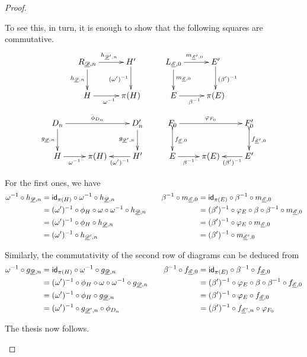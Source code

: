 \begin{proof}
\begin{itemize}
		To see this, in turn, it is enough to show that	the following squares are commutative.
		\[\xymatrix{R_{\der{D}, n} \ar[d]_{h_{\der{D}, n}}\ar[r]^{h_{\der{D}', n}} & H' \ar[d]_{(\omega')^{-1}} &L_{\der{E}, 0} \ar[d]^{m_{\der{E}, 0}}\ar[r]^{m_{\der{E}', 0}}& E' \ar[d]^{(\beta')^{-1}}\\H\ar[r]_{\omega^{-1}} &\pi(H)&E \ar[r]_{\beta^{-1}} & \pi(E)}\]
		\[\xymatrix{D_n \ar[rr]^{\phi_{D_n}} \ar[d]_{g_{\der{D}, n}}&&D'_n \ar[d]_{g_{\der{D}', n}}&F_0 \ar@{>->}[d]^{f_{\der{E}, 0}} \ar[rr]^{\varphi_{F_0}} && F_0' \ar@{>->}[d]^{f_{\der{E}', 0}}\\H \ar[r]_-{\omega^{-1}} &\pi(H)&H' \ar[l]^-{(\omega')^{-1}}  &E \ar[r]_-{\beta^{-1}} & \pi(E) & E' \ar[l]^-{(\beta')^{-1}}}\]
		
		For the first ones, we have
		\[
		\begin{split} 
			\omega^{-1} \circ h_{\underline{\mathscr{D}}, n}&=\mathsf{id}_{\pi(H)}\circ \omega^{-1} \circ h_{\underline{\mathscr{D}}, n} \\&=(\omega')^{-1}\circ \phi_H \circ \omega \circ \omega^{-1} \circ h_{\underline{\mathscr{D}}, n}\\&=(\omega')^{-1}\circ \phi_H  \circ h_{\underline{\mathscr{D}}, n}\\&=(\omega')^{-1}  \circ h_{\underline{\mathscr{D}}', n}
		\end{split} \qquad  	\begin{split} 
			\beta^{-1} \circ m_{\underline{\mathscr{E}}, 0}&=\mathsf{id}_{\pi(E)}\circ \beta^{-1} \circ m_{\underline{\mathscr{E}}, 0}\\&=(\beta')^{-1}\circ \varphi_{E} \circ \beta \circ \beta^{-1} \circ m_{\underline{\mathscr{E}}, 0}\\&=(\beta')^{-1}\circ \varphi_{E}  \circ m_{\underline{\mathscr{E}}, 0}\\&=(\beta')^{-1}  \circ m_{\underline{\mathscr{E}}', 0}
		\end{split}  \]
		
		Similarly, the commutativity of the second row of diagrams can be deduced from
		\[\begin{split}
			\omega^{-1} \circ g_{\underline{\mathscr{D}}, n}&=\mathsf{id}_{\pi(H)}\circ \omega^{-1} \circ g_{\underline{\mathscr{D}}, n}\\&=(\omega')^{-1}\circ \phi_H \circ \omega\circ \omega^{-1} \circ g_{\underline{\mathscr{D}}, n}\\&=(\omega')^{-1}\circ \phi_H  \circ g_{\underline{\mathscr{D}}, n}\\&= (\omega')^{-1} \circ g_{\underline{\mathscr{D}}', n}\circ \phi_{D_n}
		\end{split}\qquad \begin{split}\beta^{-1} \circ f_{\underline{\mathscr{E}}, 0}&=\mathsf{id}_{\pi(E)}\circ \beta^{-1} \circ f_{\underline{\mathscr{E}}, 0}\\&=(\beta')^{-1}\circ \varphi_E \circ \beta\circ \beta^{-1} \circ f_{\underline{\mathscr{E}}, 0}\\&=(\beta')^{-1}\circ \varphi_E  \circ f_{\underline{\mathscr{E}}, 0}\\&= (\beta')^{-1} \circ f_{\underline{\mathscr{E}}', n}\circ \varphi_{F_0}
		\end{split}\]
		
		The thesis now follows.	\qedhere 
	\end{itemize}	
\end{proof}

